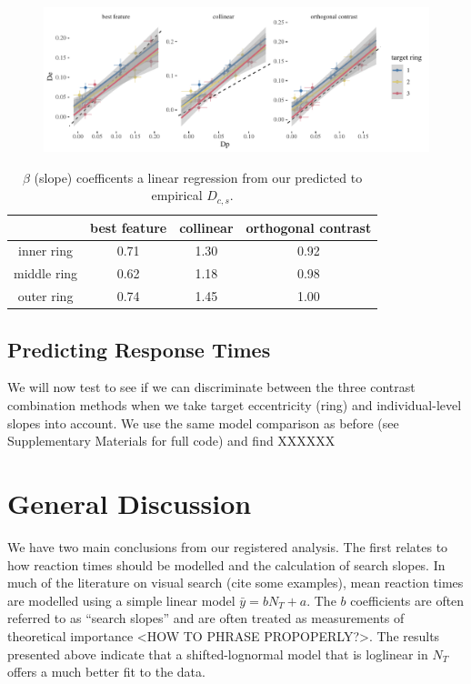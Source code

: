 \documentclass[preprint,12pt,authoryear]{elsarticle}
\begin{document}
\begin{figure}[ht]
\centering
\includegraphics[width=\textwidth]{../plots/target_ring_D_pred.pdf}
\caption{}
\label{fig:ring2_D}
\end{figure}

\begin{table}[h]
\centering
\begin{tabular}{c|ccc} 
\hline
 & best feature & collinear & orthogonal contrast\\
 \hline 
inner ring  & 0.71 & 1.30 & 0.92\\
middle ring & 0.62 & 1.18 & 0.98\\ 
outer ring  & 0.74 & 1.45 & 1.00\\
 \end{tabular}
\caption{$\beta$ (slope) coefficents a linear regression from our predicted to empirical $D_{c,s}$. }
\label{tab:new_Dc_Ds_ring}
\end{table}

\subsection{Predicting Response Times}

We will now test to see if we can discriminate between the three contrast combination methods when we take target eccentricity (ring) and individual-level slopes into account. We use the same model comparison as before (see Supplementary Materials for full code) and find XXXXXX

\section{General Discussion}



We have two main conclusions from our registered analysis. The first relates to how reaction times should be modelled and the calculation of search slopes. In much of the literature on visual search (cite some examples), mean reaction times are modelled using a simple linear model $\bar{y} = b N_T + a$. The $b$ coefficients are often referred to as ``search slopes'' and are often treated as measurements of theoretical importance <HOW TO PHRASE PROPOPERLY?>. The results presented above indicate that a shifted-lognormal model that is loglinear in $N_T$ offers a much better fit to the data.
\end{document}
